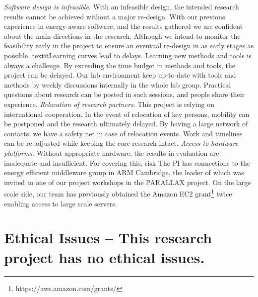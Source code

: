 \documentclass{article}
\begin{document}
  \textit{Software design is infeasible}. With an infeasible design, the intended research results cannot be achieved without a major re-design.
  With our previous experience in energy-aware software, and the results gathered we are confident about the main directions in the research. Although we intend to monitor the feasibility early in the project to ensure an eventual re-design in as early stages as possible.\smallskip
  textit{Learning curves lead to delays}. Learning new methods and tools is always a challenge. By exceeding the time budget in methods and tools, the project can be delayed.
  Our lab environment keep up-to-date with tools and methods by weekly discussions internally in the whole lab group. Practical questions about research can be posted in such sessions, and people share their experience.\smallskip
 \textit{Relocation of research partners}. This project is relying on international cooperation. In the event of relocation of key persons, mobility can be postponed and the research ultimately delayed.
 By having a large network of contacts, we have a safety net in case of relocation events. Work and timelines can be re-adjusted while keeping the core research intact.\smallskip
 \textit{Access to hardware platforms}. Without appropriate hardware, the results in evaluation are inadequate and insufficient.
 For covering this, risk The PI has connections to the energy efficient middleware group in ARM Cambridge, the leader of which was invited to one of our project workshops in the PARALLAX project.
 On the large scale side, our team has previously obtained the Amazon EC2 grant\footnote{https://aws.amazon.com/grants/} twice enabling access to large scale servers.


\section{Ethical Issues \small -- This research project has no ethical issues. }
\end{document}
